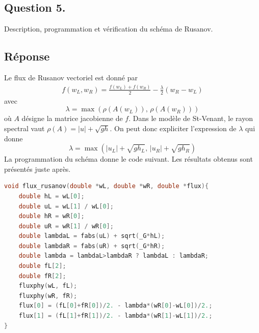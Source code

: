 \documentclass[
	french,
	11pt, %
]{fphw}
\begin{document}
\subsection*{Question 5.}
\begin{problem}
Description, programmation et vérification du schéma de Rusanov. 
\end{problem}

\subsection*{Réponse} 

Le flux de Rusanov vectoriel est donné par 
\begin{align*}
	f(w_L,w_R) = \frac{f(w_L)+f(w_R)}{2} - \frac{\lambda}{2}(w_R-w_L)
\end{align*}
avec $$ \lambda = \max(\rho(A(w_L)),\, \rho(A(w_R))) $$
où $A$ désigne la matrice jacobienne de $f$. Dans le modèle de St-Venant, le rayon spectral vaut $\rho(A) = \vert u \vert + \sqrt{gh}$. On peut donc expliciter l'expression de $\lambda$ qui donne
$$
\lambda = \max(\vert u_L \vert + \sqrt{gh_L},\, \vert u_R \vert + \sqrt{gh_R})
$$
La programmation du schéma donne le code suivant. Les résultats obtenus sont présentés juste après.

\begin{lstlisting}[language=C, caption={Programmation du flux numérique de Rusanov.},breaklines]
void flux_rusanov(double *wL, double *wR, double *flux){
	double hL = wL[0];
	double uL = wL[1] / wL[0];
	double hR = wR[0];
	double uR = wR[1] / wR[0];
	double lambdaL = fabs(uL) + sqrt(_G*hL);
	double lambdaR = fabs(uR) + sqrt(_G*hR);
	double lambda = lambdaL>lambdaR ? lambdaL : lambdaR;
	double fL[2]; 
	double fR[2]; 
	fluxphy(wL, fL);
	fluxphy(wR, fR);
	flux[0] = (fL[0]+fR[0])/2. - lambda*(wR[0]-wL[0])/2.;
	flux[1] = (fL[1]+fR[1])/2. - lambda*(wR[1]-wL[1])/2.;
}	
\end{lstlisting}
\end{document}
